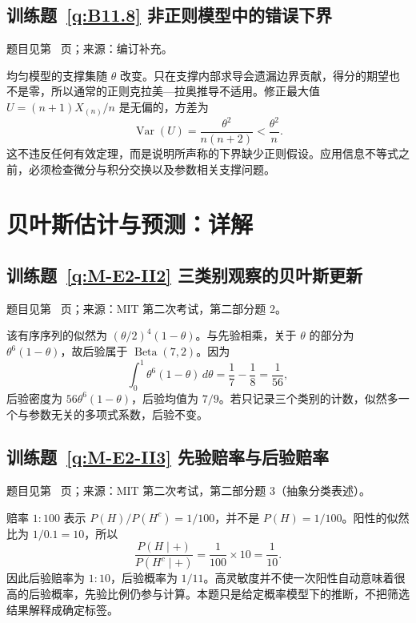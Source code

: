 \documentclass[UTF8,12pt,a4paper,fontset=fandol]{ctexbook}
\begin{document}
\subsection*{训练题~\ref{q:B11.8} 非正则模型中的错误下界}\label{a:B11.8}{\small 题目见第~\pageref{q:B11.8} 页；来源：编订补充。}
\begin{solve}均匀模型的支撑集随 $\theta$ 改变。只在支撑内部求导会遗漏边界贡献，得分的期望也不是零，所以通常的正则克拉美—拉奥推导不适用。修正最大值 $U=(n+1)X_{(n)}/n$ 是无偏的，方差为\[\operatorname{Var}(U)=\frac{\theta^2}{n(n+2)}<\frac{\theta^2}{n}.\]这不违反任何有效定理，而是说明所声称的下界缺少正则假设。应用信息不等式之前，必须检查微分与积分交换以及参数相关支撑问题。\end{solve}

\clearpage\section*{贝叶斯估计与预测：详解}

\subsection*{训练题~\ref{q:M-E2-II2} 三类别观察的贝叶斯更新}\label{a:M-E2-II2}{\small 题目见第~\pageref{q:M-E2-II2} 页；来源：MIT 第二次考试，第二部分题 2。}
\begin{solve}该有序序列的似然为 $(\theta/2)^4(1-\theta)$。与先验相乘，关于 $\theta$ 的部分为 $\theta^6(1-\theta)$，故后验属于 $\operatorname{Beta}(7,2)$。因为\[\int_0^1\theta^6(1-\theta)\,d\theta=\frac17-\frac18=\frac1{56},\]后验密度为 $56\theta^6(1-\theta)$，后验均值为 $7/9$。若只记录三个类别的计数，似然多一个与参数无关的多项式系数，后验不变。\end{solve}

\subsection*{训练题~\ref{q:M-E2-II3} 先验赔率与后验赔率}\label{a:M-E2-II3}{\small 题目见第~\pageref{q:M-E2-II3} 页；来源：MIT 第二次考试，第二部分题 3（抽象分类表述）。}
\begin{solve}赔率 $1:100$ 表示 $P(H)/P(H^c)=1/100$，并不是 $P(H)=1/100$。阳性的似然比为 $1/0.1=10$，所以\[\frac{P(H\mid+)}{P(H^c\mid+)}=\frac1{100}\times10=\frac1{10}.\]因此后验赔率为 $1:10$，后验概率为 $1/11$。高灵敏度并不使一次阳性自动意味着很高的后验概率，先验比例仍参与计算。本题只是给定概率模型下的推断，不把筛选结果解释成确定标签。\end{solve}
\end{document}
